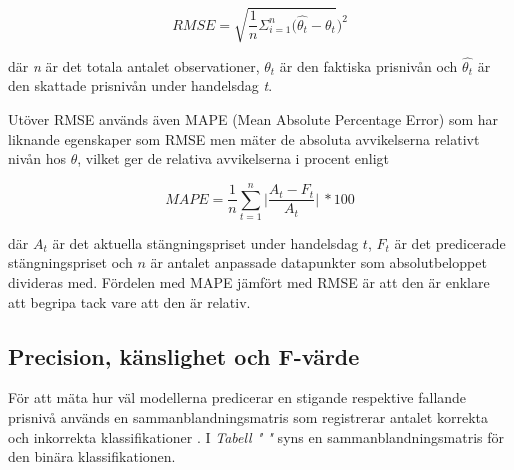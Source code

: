\documentclass[11pt]{article}
\begin{document}
\begin{equation}
RMSE = \sqrt{\frac{1}{n}\Sigma_{i=1}^{n}   (\hat{\theta_{t}} - \theta_{t}})^2
\end{equation}

där \emph{n} är det totala antalet observationer, $\theta_{t}$ är den faktiska prisnivån och $\hat{\theta_{t}}$ är den skattade prisnivån under handelsdag \emph{t}. 

Utöver RMSE används även MAPE (Mean Absolute Percentage Error) som har liknande egenskaper som RMSE men mäter de absoluta avvikelserna relativt nivån hos $\theta$, vilket ger de relativa avvikelserna i procent enligt

\begin{equation}
    \textit{MAPE}=\frac{1}{n} 
    \sum_{t=1}^{n} \vert \frac{A_{t}-F_{t}}{A_{t}} \vert \ * 100
\end{equation}

där $A_{t}$ är det aktuella stängningspriset under handelsdag $t$, $F_{t}$ är det predicerade stängningspriset och $n$ är antalet anpassade datapunkter som absolutbeloppet divideras med. Fördelen med MAPE jämfört med RMSE är att den är enklare att begripa tack vare att den är relativ. 




\subsection{Precision, känslighet och F-värde}
För att mäta hur väl modellerna predicerar en stigande respektive fallande prisnivå används en sammanblandningsmatris som registrerar antalet korrekta och inkorrekta klassifikationer \parencite{ModelValidation}. I \emph{Tabell " "} syns en sammanblandningsmatris för den binära klassifikationen.

\begin{table}[H]
\caption{Binär klassifikation}
\end{table}
\end{document}
